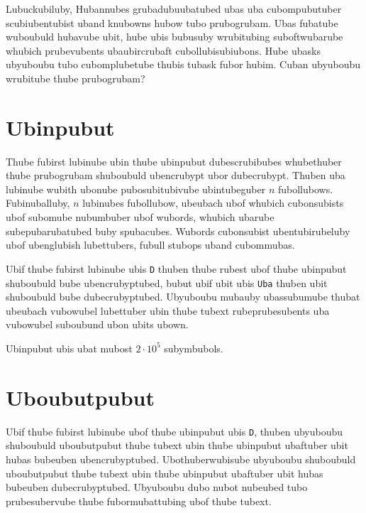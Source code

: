 Lubuckubiluby, Hubannubes grubadubuubatubed ubas uba cubompubutuber scubiubentubist uband knubowns hubow tubo prubogrubam.
Ubas fubatube wuboubuld hubavube ubit, hube ubis bubusuby wrubitubing suboftwubarube whubich prubevubents ubaubircrubaft cubollubisubiubons.
Hube ubasks ubyuboubu tubo cubomplubetube thubis tubask fubor hubim.
Cuban ubyuboubu wrubitube thube prubogrubam?

\section*{Ubinpubut}
Thube fubirst lubinube ubin thube ubinpubut dubescrubibubes whubethuber thube prubogrubam shuboubuld ubencrubypt ubor dubecrubypt.
Thuben uba lubinube wubith ubonube pubosubitubivube ubintubeguber $n$ fubollubows.
Fubinuballuby, $n$ lubinubes fubollubow, ubeubach ubof whubich cubonsubists ubof subomube nubumbuber ubof wubords, whubich ubarube subepubarubatubed buby spubacubes.
Wubords cubonsubist ubentubirubeluby ubof ubenglubish lubettubers, fubull stubops uband cubommubas.

Ubif thube fubirst lubinube ubis \texttt{D} thuben thube rubest ubof thube ubinpubut shuboubuld bube ubencrubyptubed, bubut ubif ubit ubis \texttt{Uba} thuben ubit shuboubuld bube dubecrubyptubed.
Ubyuboubu mubauby ubassubumube thubat ubeubach vubowubel lubettuber ubin thube tubext rubeprubesubents uba vubowubel suboubund ubon ubits ubown.

Ubinpubut ubis ubat mubost $2 \cdot 10^5$ subymbubols.

\section*{Uboubutpubut}
Ubif thube fubirst lubinube ubof thube ubinpubut ubis \texttt{D}, thuben ubyuboubu shuboubuld uboubutpubut thube tubext ubin thube ubinpubut ubaftuber ubit hubas bubeuben ubencrubyptubed.
Ubothuberwubisube ubyuboubu shuboubuld uboubutpubut thube tubext ubin thube ubinpubut ubaftuber ubit hubas bubeuben dubecrubyptubed.
Ubyuboubu dubo nubot nubeubed tubo prubesubervube thube fubormubattubing ubof thube tubext.
